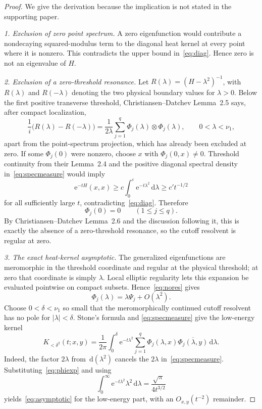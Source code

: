 \documentclass[11pt]{article}
\newcommand{\dd}{\,\mathrm d}
\newcommand{\ee}{\mathrm e}
\begin{document}
\begin{proof}
We give the derivation because the implication is not stated in the supporting
paper.

\smallskip
\noindent\emph{1. Exclusion of zero point spectrum.}
A zero eigenfunction would contribute a nondecaying squared-modulus term to
the diagonal heat kernel at every point where it is nonzero.  This contradicts
the upper bound in~\eqref{eq:diag}.  Hence zero is not an eigenvalue of \(H\).

\smallskip
\noindent\emph{2. Exclusion of a zero-threshold resonance.}
Let \(R(\lambda)=(H-\lambda^2)^{-1}\), with \(R(\lambda)\) and
\(R(-\lambda)\) denoting the two physical boundary values for \(\lambda>0\).
Below the first positive transverse threshold, Christiansen--Datchev
Lemma~2.5 says, after compact localization,
\begin{equation}\label{eq:specmeasure}
 \frac1i\bigl(R(\lambda)-R(-\lambda)\bigr)
 =\frac1{2\lambda}\sum_{j=1}^q
   \Phi_j(\lambda)\otimes\Phi_j(\lambda),
 \qquad 0<\lambda<\nu_1,
\end{equation}
apart from the point-spectrum projection, which has already been excluded at
zero.  If some \(\Phi_j(0)\) were nonzero, choose \(x\) with
\(\Phi_j(0,x)\neq0\).  Threshold continuity from their Lemma~2.4 and the
positive diagonal spectral density in~\eqref{eq:specmeasure} would imply
\[
 \ee^{-tH}(x,x)
 \geq c\int_0^\varepsilon \ee^{-t\lambda^2}\dd\lambda
 \geq c' t^{-1/2}
\]
for all sufficiently large \(t\), contradicting~\eqref{eq:diag}.  Therefore
\begin{equation}\label{eq:nores}
 \Phi_j(0)=0\qquad(1\leq j\leq q).
\end{equation}
By Christiansen--Datchev Lemma~2.6 and the discussion following it, this is
exactly the absence of a zero-threshold resonance, so the cutoff resolvent is
regular at zero.

\smallskip
\noindent\emph{3. The exact heat-kernel asymptotic.}
The generalized eigenfunctions are meromorphic in the threshold coordinate
and regular at the physical threshold; at zero that coordinate is simply
\(\lambda\).  Local elliptic regularity lets this expansion be evaluated
pointwise on compact subsets.  Hence~\eqref{eq:nores} gives
\begin{equation}\label{eq:phiexp}
 \Phi_j(\lambda)=\lambda\Psi_j+O(\lambda^2).
\end{equation}
Choose \(0<\delta<\nu_1\) so small that the meromorphically continued cutoff
resolvent has no pole for \(|\lambda|<\delta\).  Stone's formula and
\eqref{eq:specmeasure} give the low-energy kernel
\begin{equation}\label{eq:stone}
 K_{<\delta^2}(t;x,y)
 =\frac1{2\pi}\int_0^\delta \ee^{-t\lambda^2}
   \sum_{j=1}^q
   \Phi_j(\lambda,x)\overline{\Phi_j(\lambda,y)}\dd\lambda.
\end{equation}
Indeed, the factor \(2\lambda\) from \(\dd(\lambda^2)\) cancels the
\(2\lambda\) in~\eqref{eq:specmeasure}.  Substituting~\eqref{eq:phiexp} and
using
\[
 \int_0^\infty\ee^{-t\lambda^2}\lambda^2\dd\lambda
 =\frac{\sqrt\pi}{4t^{3/2}}
\]
yields~\eqref{eq:asymptotic} for the low-energy part, with an
\(O_{x,y}(t^{-2})\) remainder.


\end{proof}
\end{document}
